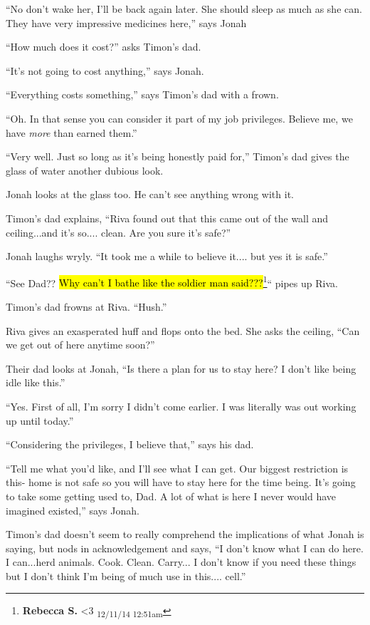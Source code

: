 ``No don't wake her, I'll be back again later.  She should sleep as much as she can.  They have very impressive medicines here,'' says Jonah

``How much does it cost?'' asks Timon's dad.

``It's not going to cost anything,'' says Jonah.

``Everything costs something,'' says Timon's dad with a frown.

``Oh.  In that sense you can consider it part of my job privileges.  Believe me, we have \textit{more} than earned them.''

``Very well.  Just so long as it's being honestly paid for,'' Timon's dad gives the glass of water another dubious look.

Jonah looks at the glass too.  He can't see anything wrong with it.

Timon's dad explains, ``Riva found out that this came out of the wall and ceiling...and it's so.... clean.  Are you sure it's safe?''

Jonah laughs wryly.  ``It took me a while to believe it.... but yes it is safe.''

``See Dad??  \hl{Why can't I bathe like the soldier man said???}\footnote{\textbf{Rebecca S. }\textless 3 \textsubscript{12/11/14 12:51am}}`` pipes up Riva.

Timon's dad frowns at Riva.  ``Hush.''

Riva gives an exasperated huff and flops onto the bed. She asks the ceiling, ``Can we get out of here anytime soon?''

Their dad looks at Jonah, ``Is there a plan for us to stay here?  I don't like being idle like this.''

``Yes.  First of all, I'm sorry I didn't come earlier.  I was literally was out working up until today.''

``Considering the privileges, I believe that,'' says his dad.

``Tell me what you'd like, and I'll see what I can get.  Our biggest restriction is this- home is not safe so you will have to stay here for the time being.  It's going to take some getting used to, Dad. A lot of what is here I never would have imagined existed,'' says Jonah.

Timon's dad doesn't seem to really comprehend the implications of what Jonah is saying, but nods in acknowledgement and says, ``I don't know what I can do here.  I can...herd animals.  Cook.  Clean.  Carry... I don't know if you need these things but I don't think I'm being of much use in this.... cell.''

